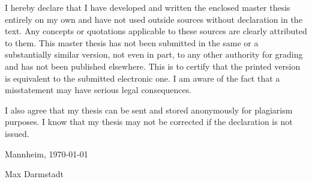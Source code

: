 
{I hereby declare that I have developed and written the enclosed master thesis entirely on my own and have not used outside sources without declaration in the text. Any concepts or quotations applicable to these sources are clearly attributed to them. This master thesis has not been submitted in the same or a substantially similar version, not even in part, to any other authority for grading and has not been published elsewhere. This is to certify that the printed version is equivalent to the submitted electronic one. I am aware of the fact that a misstatement may have serious legal consequences.\par}

\vspace{0.7cm}
{I also agree that my thesis can be sent and stored anonymously for plagiarism purposes. I know that my thesis may not be corrected if the declaration is not issued.\par}
\vspace{0.7cm}


Mannheim, \today

\vspace{1.4cm}
Max Darmstadt